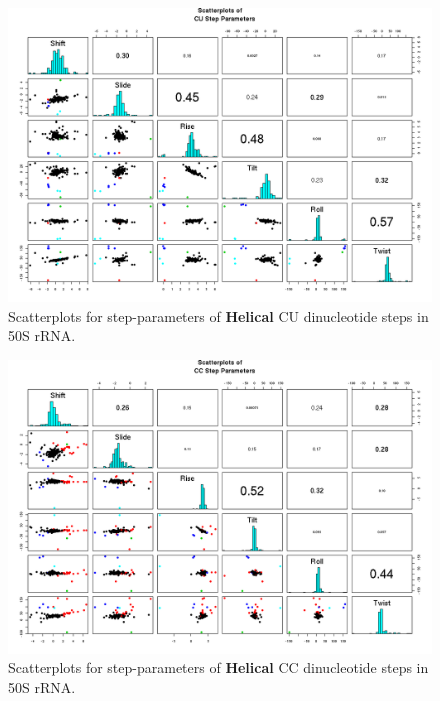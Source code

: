 \begin{figure}[H]
\centering
\includegraphics[angle=90, scale=0.6]{Helical/CU.png}
\caption{Scatterplots for step-parameters of \textbf{Helical} CU dinucleotide steps
in 50S rRNA.}
\label{fig:stepsCU}
\end{figure}

\begin{figure}[H]
\centering
\includegraphics[angle=90, scale=0.6]{Helical/CC.png}
\caption{Scatterplots for step-parameters of \textbf{Helical} CC dinucleotide steps
in 50S rRNA.}
\label{fig:stepsCC}
\end{figure}

